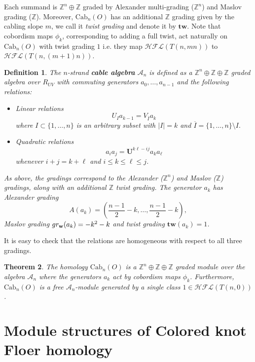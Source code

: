 \documentclass[10pt,a4paper]{amsart}
\theoremstyle{plain}
\newtheorem{theorem}{Theorem}
\newtheorem{definition}[theorem]{Definition}
\newcommand{\CA}{\mathcal{A}}
\newcommand{\Cab}{\mathrm{Cab}}
\newcommand{\cHFL}{\mathcal{H\!F\! L}}
\newcommand{\Z}{\mathbb{Z}}
\newcommand{\UU}{\mathbf{U}}
\newcommand{\tw}{\mathbf{tw}}
\newcommand{\w}{\mathbf{w}}
\def\gr{\textup{gr}}
\newcommand{\newword}[1]{\emph{\textbf{#1}}}
\begin{document}
Each summand is $\Z^n\oplus \Z$ graded by Alexander multi-grading ($\Z^n$) and Maslov grading ($\Z$). Moreover, $\Cab_n(O)$ has an additional $\Z$ grading given by the cabling slope $m$, we call it \emph{twist grading} and denote it by $\tw$. Note that cobordism maps $\phi_k$, corresponding to adding a full twist, act naturally on $\Cab_n(O)$ with twist grading $1$ i.e. they map $\cHFL(T(n,mn))$ to $\cHFL(T(n,(m+1)n))$. 

\begin{definition}
The $n$-strand \newword{cable algebra} $\CA_n$ is defined as a $\Z^n\oplus \Z\oplus \Z$ graded algebra  over $R_{UV}$ with commuting generators $a_0,\ldots,a_{n-1}$ and the following relations:
\begin{itemize}
\item Linear relations
\begin{equation}
\label{eq: linear}
U_Ia_{k-1}=V_{\overline{I}}a_k
\end{equation}
where $I\subset \{1,\ldots,n\}$ is an arbitrary subset with $|I|=k$ and $\overline{I}=\{1,\ldots,n\}\setminus I.$ 
\item Quadratic relations
\begin{equation}
\label{eq: quadratic}
a_ia_j=\UU^{k\ell-ij}a_{k}a_{\ell}
\end{equation} 
whenever $i+j=k+\ell$ and $i\le k\le \ell\le j$.
\end{itemize}
As above, the gradings correspond to the Alexander ($\Z^n$) and Maslov ($\Z$) gradings, along with an additional  $\Z$ \emph{twist grading}. The generator $a_k$ has Alexander grading 
$$
A(a_k)=\left(\frac{n-1}{2}-k,\ldots, \frac{n-1}{2}-k\right),
$$
Maslov grading $\gr_{\w}(a_k)=-k^2-k$ and twist grading $\tw(a_k)=1$.
\end{definition}

It is easy to check that the relations are homogeneous with respect to all three gradings.

\begin{theorem}
\label{thm: cabled algebra}
The homology $\Cab_n(O)$ is a $\Z^n\oplus \Z\oplus \Z$ graded module over the algebra $\CA_n$ where the generators $a_k$ act by cobordism maps $\phi_k$. Furthermore, $\Cab_n(O)$ is a free $\CA_n$-module generated by a single class $1\in \cHFL(T(n,0))$.
\end{theorem}

\section{Module structures of Colored knot Floer homology}
\end{document}
